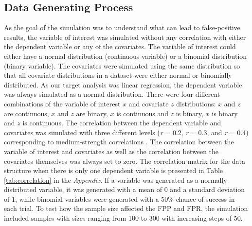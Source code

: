\subsection{Data Generating Process}
As the goal of the simulation was to understand what can lead to false-positive results, the variable of interest was simulated without any correlation with either the dependent variable or any of the covariates. The variable of interest could either have a normal distribution (continuous variable) or a binomial distribution (binary variable). The covariates were simulated using the same distribution so that all covariate distributions in a dataset were either normal or binomially distributed. As our target analysis was linear regression, the dependent variable was always simulated as a normal distribution. There were four different combinations of the variable of interest $x$ and covariate $z$ distributions: $x$ and $z$ are continuous, $x$ and $z$ are binary, $x$ is continuous and $z$ is binary, $x$ is binary and $z$ is continuous. The correlation between the dependent variable and covariates was simulated with three different levels (\textit{r} = 0.2, \textit{r} = 0.3, and \textit{r} = 0.4) corresponding to medium-strength correlations \citep{Cohen1989}. The correlation between the variable of interest and covariates as well as the correlation between the covariates themselves was always set to zero. The correlation matrix for the data structure when there is only one dependent variable is presented in Table \ref{tab:correlation} in the \textit{Appendix}. If a variable was generated as a normally distributed variable, it was generated with a mean of 0 and a standard deviation of 1, while binomial variables were generated with a 50\% chance of success in each trial. To test how the sample size affected the FPP and FPR, the simulation included samples with sizes ranging from 100 to 300 with increasing steps of 50. 

